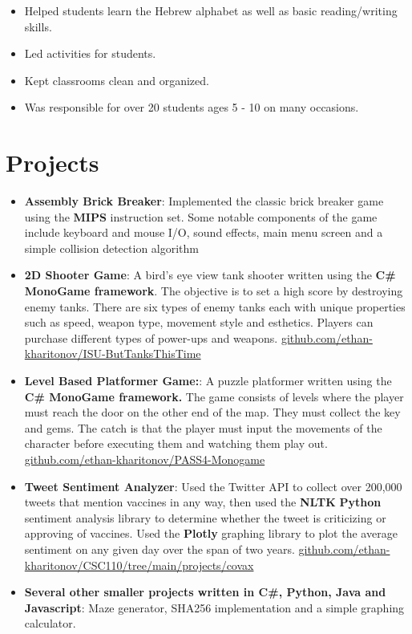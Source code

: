 \documentclass[a4paper,20pt]{article}
\newcommand{\resumeItem}[2]{
	\item\small{
		\textbf{#1}{: #2 \vspace{-2pt}}
	}
}
\newcommand{\resumeSubItem}[2]{\resumeItem{#1}{#2}\vspace{-3pt}}
\newcommand{\resumeSubHeadingListStart}{\begin{itemize}[leftmargin=*]}
\newcommand{\resumeSubHeadingListEnd}{\end{itemize}}
\newcommand{\resumeItemListStart}{\begin{itemize}}
\newcommand{\resumeItemListEnd}{\end{itemize}\vspace{-5pt}}
\begin{document}
	\resumeItemListStart
	\item\small{Helped students learn the Hebrew alphabet as well as basic reading/writing skills. \vspace{-8pt}}
	\item\small{Led activities for students. \vspace{-8pt}}
	\item\small{Kept classrooms clean and organized. \vspace{-8pt}}
	\item\small{Was responsible for over 20 students ages 5 - 10 on many occasions.}
	\resumeItemListEnd
	
	
	\vspace{-5pt}
	\section{Projects}
	\resumeSubHeadingListStart
	\resumeSubItem{Assembly Brick Breaker}{Implemented the classic brick breaker game using the \textbf{MIPS} instruction set. Some notable components of the game include keyboard and mouse I/O, sound effects, main menu screen and a simple collision detection algorithm}
	\resumeSubItem{2D Shooter Game}{A bird's eye view tank shooter written using the \textbf{C\# MonoGame framework}. The objective is to set a high score by destroying enemy tanks. There are six types of enemy tanks each with unique properties such as speed, weapon type, movement style and esthetics. Players can purchase different types of power-ups and weapons. \href{https://github.com/ethan-kharitonov/ISU-ButTanksThisTime}{github.com/ethan-kharitonov/ISU-ButTanksThisTime}}
	\vspace{2pt}
	\resumeSubItem{Level Based Platformer Game:}{A puzzle platformer written using the \textbf{C\# MonoGame framework.} The game consists of levels where the player must reach the door on the other end of the map. They must collect the key and gems. The catch is that the player must input the movements of the character before executing them and watching them play out. \href{https://github.com/ethan-kharitonov/PASS4-Monogame}{github.com/ethan-kharitonov/PASS4-Monogame}}
	\resumeSubItem{Tweet Sentiment Analyzer}{Used the Twitter API to collect over 200,000 tweets that mention vaccines in any way, then used the \textbf{NLTK} \textbf{Python} sentiment analysis library to determine whether the tweet is criticizing or approving of vaccines. Used the \textbf{Plotly} graphing library to plot the average sentiment on any given day over the span of two years.
	\href{https://github.com/ethan-kharitonov/CSC110/tree/main/projects/covax}{github.com/ethan-kharitonov/CSC110/tree/main/projects/covax}}
	\vspace{2pt}
	\resumeSubItem{Several other smaller projects written in C\#, Python, Java and Javascript}{Maze generator, SHA256 implementation and a simple graphing calculator.}
	\vspace{2pt}
	\resumeSubHeadingListEnd
	\vspace{-5pt}
\end{document}
